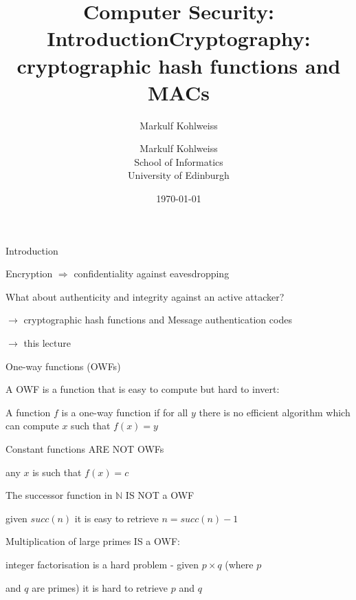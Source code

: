 \documentclass[aspectratio=169, lualatex, handout, 10pt,dvipsnames,svgnames]{beamer} %
\title{Computer Security: Introduction}
\author{Markulf Kohlweiss}
\institute{University of Edinburgh, School of Informatics}
\date{\today}
\title{Cryptography: cryptographic hash functions and MACs}
\author{Markulf Kohlweiss\\
  School of Informatics \\
  University of Edinburgh}
\date{}
\begin{document}
\begin{frame}
  \maketitle
\end{frame}

\begin{frame}{Introduction}


  Encryption $\Rightarrow$ confidentiality against eavesdropping
  \bigskip{}
  \bigskip{}
  \pause

  What about authenticity and integrity against an active attacker?

  $\longrightarrow$ cryptographic hash functions and Message authentication codes

  $\longrightarrow$ this lecture


\end{frame}

\begin{frame}{One-way functions (OWFs)}

  A OWF is a function that is easy to compute but hard to invert:

  \begin{definition}
    A function $f$ is a one-way function if for all $y$ there is no efficient algorithm which can compute $x$ such that $f(x)=y$
  \end{definition}
  \pause
  \bigskip{}


  \color{vert}

  Constant functions ARE NOT OWFs
  
  \quad any $x$ is such that $f(x)=c$
  \bigskip{} 
  \pause

  The successor function in $\mathbb N$ IS NOT a OWF

  \quad given $succ(n)$ it is easy to retrieve $n=succ(n)-1$
  \bigskip{} 
  \pause

  Multiplication of large primes IS a OWF:

  \quad integer factorisation is a hard problem - given $p\times q$ (where $p$ 

  \quad and $q$ are primes) it is hard to retrieve $p$ and $q$
  \color{black}

\end{frame}
\end{document}
